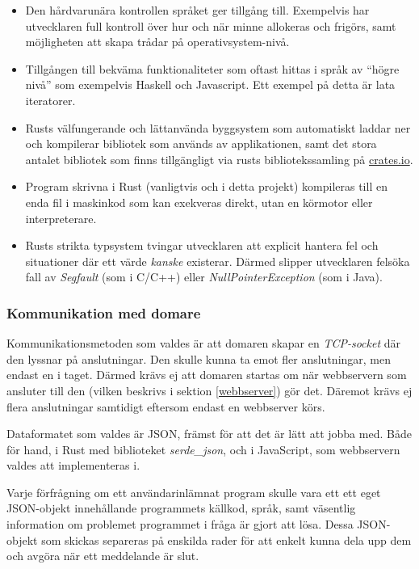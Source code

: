 \documentclass{article}
\begin{document}
\begin{itemize}
	\item Den hårdvarunära kontrollen språket ger tillgång till. Exempelvis har
		utvecklaren full kontroll över hur och när minne allokeras och frigörs,
		samt möjligheten att skapa trådar på operativsystem-nivå.
	\item Tillgången till bekväma funktionaliteter som oftast hittas i språk av
		``högre nivå'' som exempelvis Haskell och Javascript. Ett exempel på detta
		är lata iteratorer.
	\item Rusts välfungerande och lättanvända byggsystem som automatiskt
		laddar ner och kompilerar bibliotek som används av applikationen, samt
		det stora antalet bibliotek som finns tillgängligt via rusts
		bibliotekssamling på \href{https://crates.io}{crates.io}.
	\item Program skrivna i Rust (vanligtvis och i detta projekt) kompileras
		till en enda fil i maskinkod som kan exekveras direkt, utan en körmotor
		eller interpreterare.
	\item Rusts strikta typsystem tvingar utvecklaren att explicit hantera fel
		och situationer där ett värde \textit{kanske} existerar. Därmed slipper
		utvecklaren felsöka fall av \textit{Segfault} (som i C/C++) eller
		\textit{NullPointerException} (som i Java).
\end{itemize}

\subsubsection{Kommunikation med domare}

Kommunikationsmetoden som valdes är att domaren skapar en \textit{TCP-socket}
där den lyssnar på anslutningar. Den skulle kunna ta emot fler anslutningar, men
endast en i taget. Därmed krävs ej att domaren startas om när webbservern som
ansluter till den (vilken beskrivs i sektion \ref{webbserver}) gör det. Däremot
krävs ej flera anslutningar samtidigt eftersom endast en webbserver körs.

Dataformatet som valdes är JSON, främst för att det är lätt att jobba med. Både
för hand, i Rust med biblioteket \textit{serde\_json}, och i JavaScript, som
webbservern valdes att implementeras i.

Varje förfrågning om ett användarinlämnat program skulle vara ett ett eget
JSON-objekt innehållande programmets källkod, språk, samt väsentlig information
om problemet programmet i fråga är gjort att lösa. Dessa JSON-objekt som skickas
separeras på enskilda rader för att enkelt kunna dela upp dem och avgöra när ett
meddelande är slut.
\end{document}
